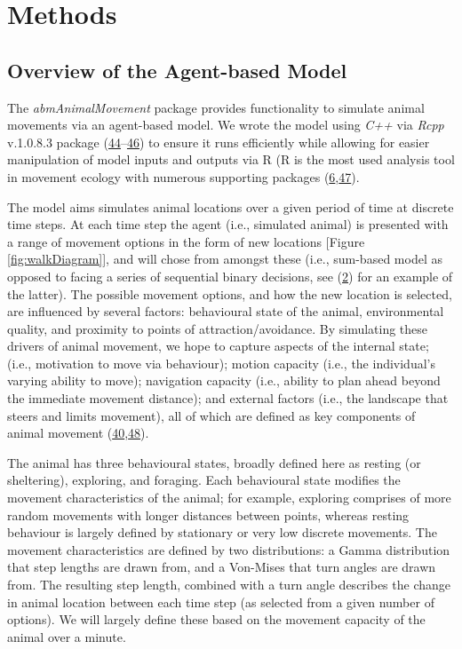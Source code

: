 \documentclass[10pt,a4paper]{article}
\begin{document}
\hypertarget{methods}{%
\section{Methods}\label{methods}}

\hypertarget{overview-of-the-agent-based-model}{%
\subsection{Overview of the Agent-based Model}\label{overview-of-the-agent-based-model}}

The \emph{abmAnimalMovement} package provides functionality to simulate animal movements via an agent-based model.
We wrote the model using \emph{C++} via \emph{Rcpp} v.1.0.8.3 package (\protect\hyperlink{ref-Eddelbuettel_seamless_2011}{44}--\protect\hyperlink{ref-Eddelbuettel_extending_2018}{46}) to ensure it runs efficiently while allowing for easier manipulation of model inputs and outputs via R (R is the most used analysis tool in movement ecology with numerous supporting packages (\protect\hyperlink{ref-joo_recent_2022}{6},\protect\hyperlink{ref-joo_navigating_2020}{47}).

The model aims simulates animal locations over a given period of time at discrete time steps.
At each time step the agent (i.e., simulated animal) is presented with a range of movement options in the form of new locations {[}Figure \ref{fig:walkDiagram}{]}, and will chose from amongst these (i.e., sum-based model as opposed to facing a series of sequential binary decisions, see (\protect\hyperlink{ref-sridhar_geometry_2021}{2}) for an example of the latter).
The possible movement options, and how the new location is selected, are influenced by several factors: behavioural state of the animal, environmental quality, and proximity to points of attraction/avoidance.
By simulating these drivers of animal movement, we hope to capture aspects of the internal state; (i.e., motivation to move via behaviour); motion capacity (i.e., the individual's varying ability to move); navigation capacity (i.e., ability to plan ahead beyond the immediate movement distance); and external factors (i.e., the landscape that steers and limits movement), all of which are defined as key components of animal movement (\protect\hyperlink{ref-Tang2010}{40},\protect\hyperlink{ref-Nathan2008}{48}).

The animal has three behavioural states, broadly defined here as resting (or sheltering), exploring, and foraging.
Each behavioural state modifies the movement characteristics of the animal; for example, exploring comprises of more random movements with longer distances between points, whereas resting behaviour is largely defined by stationary or very low discrete movements.
The movement characteristics are defined by two distributions: a Gamma distribution that step lengths are drawn from, and a Von-Mises that turn angles are drawn from.
The resulting step length, combined with a turn angle describes the change in animal location between each time step (as selected from a given number of options).
We will largely define these based on the movement capacity of the animal over a minute.
\end{document}

